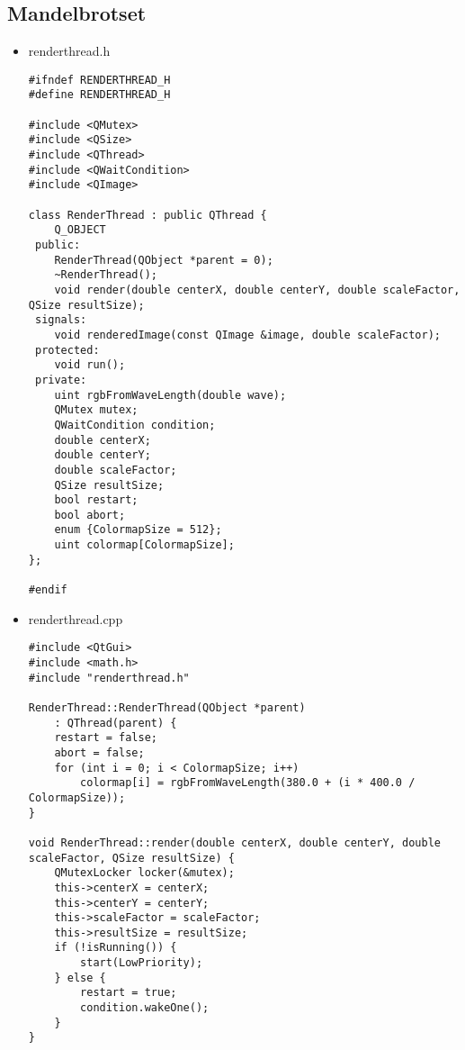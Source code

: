 \documentclass[9pt,b5paper]{article}
\begin{document}
\subsection{Mandelbrotset}
\label{sec-6-4}
\begin{itemize}
\item renderthread.h
\lstset{language=java,label= ,caption= ,numbers=none}
\begin{lstlisting}
#ifndef RENDERTHREAD_H
#define RENDERTHREAD_H

#include <QMutex>
#include <QSize>
#include <QThread>
#include <QWaitCondition>
#include <QImage>

class RenderThread : public QThread {
    Q_OBJECT
 public:
    RenderThread(QObject *parent = 0);
    ~RenderThread();
    void render(double centerX, double centerY, double scaleFactor, QSize resultSize);
 signals:
    void renderedImage(const QImage &image, double scaleFactor);
 protected:
    void run();
 private:
    uint rgbFromWaveLength(double wave);
    QMutex mutex;
    QWaitCondition condition;
    double centerX;
    double centerY;
    double scaleFactor;
    QSize resultSize;
    bool restart;
    bool abort;
    enum {ColormapSize = 512};
    uint colormap[ColormapSize];
};

#endif
\end{lstlisting}
\item renderthread.cpp
\lstset{language=java,label= ,caption= ,numbers=none}
\begin{lstlisting}
#include <QtGui>
#include <math.h>
#include "renderthread.h"

RenderThread::RenderThread(QObject *parent)
    : QThread(parent) {
    restart = false;
    abort = false;
    for (int i = 0; i < ColormapSize; i++)
        colormap[i] = rgbFromWaveLength(380.0 + (i * 400.0 / ColormapSize));
}

void RenderThread::render(double centerX, double centerY, double scaleFactor, QSize resultSize) {
    QMutexLocker locker(&mutex);
    this->centerX = centerX;
    this->centerY = centerY;
    this->scaleFactor = scaleFactor;
    this->resultSize = resultSize;
    if (!isRunning()) {
        start(LowPriority);
    } else {
        restart = true;
        condition.wakeOne();
    }
}


\end{lstlisting}
\end{itemize}
\end{document}
